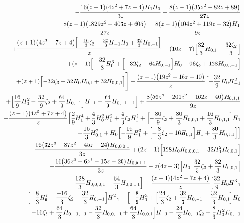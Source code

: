 \begin{eqnarray}
\nonumber\\&&
+\frac{16 (z-1) \big(4 z^2+7 z+4\big) H_1 H_0}{3 z}
-\frac{8  (z-1)  \big(35 z^2-82 z+89\big)}{27 z}
\nonumber\\&&
-\frac{8 (z-1) \big(1829 z^2-403  z+605\big)}{27 z}
-\frac{8 (z-1) \big(104 z^2+119 z+32\big) H_1}{9 z}
\nonumber\\&&
+\frac{(z+1) \big(4 z^2-7
  z+4\big) \Bigl[-\frac{16}{3}  \zeta_2-\frac{32}{3}  H_{-1}  H_0+\frac{32}{3}  H_{0,-1}\Bigr]}{z}
+(10 z+7) \Bigl[\frac{32}{3} H_{0,1}-\frac{32 \zeta_2}{3}\Bigr]
\nonumber\\&&
+(z-1)\Bigl[-\frac{32}{3} H_0^3+\Bigl[-32  \zeta_2-64  H_{0,-1}\Bigr]H_0
-96  \zeta_3+128  H_{0,0,-1}\Bigr]
\nonumber\\&&
+(z+1) \Bigl[-32 \zeta_3-32 H_0 H_{0,1}+32 H_{0,0,1}\Bigr]\Biggr]
+\frac{(z+1) \big(19 z^2-16 z+10\big)}{z}
 \Bigl[-\frac{32}{9} H_0  H_{-1}^2
\nonumber\\&&
+\Bigl[\frac{16}{9} H_0^2-\frac{32}{9}  \zeta_2+\frac{64}{9} H_{0,-1}
\Bigr] H_{-1}-\frac{64}{9} H_{0,-1,-1}
\Bigr]
+\frac{8 \big(56 z^3-201 z^2-162 z-40\big) H_{0,1,1}}{9 z}
\nonumber\\&&
+\frac{(z-1) \big(4 z^2+7 z+4\big)}{z}
 \Bigl[\frac{2}{9} H_1^4
+\frac{4}{3} H_0^2  H_1^2
+\frac{4}{3} \zeta_2 H_1^2+\Bigl[-\frac{80}{9} \zeta_3+\frac{80}{3} H_{0,0,1}+\frac{16}{3} H_{0,1,1}\Bigr] H_1
\nonumber\\&&
-\frac{16}{3}  H_{0,1}^2
+H_0 \Bigl[-\frac{16}{9} H_1^3+\Bigl[-\frac{8}{3} \zeta_2-16  H_{0,1}\Bigr] H_1+\frac{80}{3} H_{0,1,1}\Bigr]\Bigr]
\nonumber\\&&
+\frac{16 \big(32 z^3-87 z^2+45 z-24\big) H_{0,0,0,1}}{3 z}+(2 z-1) \Bigl[128 H_0 H_{0,0,0,1}-32 H_0^2 H_{0,0,1}\Bigr]
\nonumber\\&&
-\frac{16 \big(36 z^3+6 z^2-15 z-20\big) H_{0,0,1,1}}{3 z}+z (4 z-3) \Bigl[H_0\Bigl[\frac{32}{3}  \zeta_3+\frac{32}{3}  H_{0,0,1}\Bigr]
\nonumber\\&&
-\frac{128}{3}  H_{0,0,0,1}+\frac{64}{3}  H_{0,0,1,1}\Bigr]
+\frac{(z+1) \big(4 z^2-7 z+4\big) }{z}
\Bigl[\frac{32}{9} H_0  H_{-1}^3
\nonumber\\&&
+\Bigl[-\frac{8}{3} H_0^2-\frac{-16}{3}  \zeta_2-\frac{32}{3} H_{0,-1}
\Bigr] H_{-1}^2+\Bigl[-\frac{8}{9} H_0^3+\Bigl[\frac{24}{3} \zeta_2
+\frac{32}{3} H_{0,-1}-\frac{32}{3}   H_{0,1}\Bigr] H_0
\nonumber\\&&
-16 \zeta_3+\frac{64}{3}  H_{0,-1,-1}-\frac{32}{3}  H_{0,0,-1}
+\frac{64}{3} H_{0,0,1}
\Bigr] H_{-1}
-\frac{24}{3} H_{0,-1} \zeta_2+\frac{8}{3} H_0^2 H_{0,-1}

\end{eqnarray}
